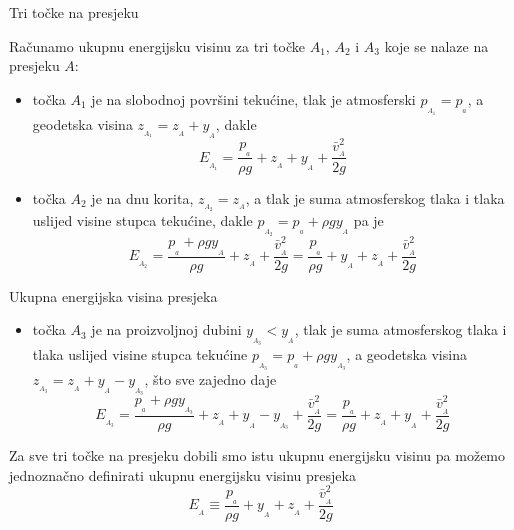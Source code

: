 \documentclass{beamer}
\begin{document}
\begin{frame}{Tri točke na presjeku}

Računamo ukupnu energijsku visinu za tri točke $A_{1}$, $A_{2}$
i $A_{3}$ koje se nalaze na presjeku $A$:
\begin{itemize}
\item točka $A_{1}$ je na slobodnoj površini tekućine, tlak je atmosferski
$p_{_{A_{1}}}=p_{_{a}}$, a geodetska visina $z_{_{A_{1}}}=z_{_{A}}+y_{_{A}}$,
dakle
\[
E_{_{A_{1}}}=\frac{p_{_{a}}}{\rho g}+z_{_{A}}+y_{_{A}}+\frac{\bar{v}_{_{A}}^{2}}{2g}
\]
\item točka $A_{2}$ je na dnu korita, $z_{_{A_{2}}}=z_{_{A}}$, a tlak
je suma atmosferskog tlaka i tlaka uslijed visine stupca tekućine,
dakle $p_{_{A_{2}}}=p_{_{a}}+\rho gy_{_{A}}$ pa je 
\[
E_{_{A_{2}}}=\frac{p_{_{a}}+\rho gy_{_{A}}}{\rho g}+z_{_{A}}+\frac{\bar{v}_{_{A}}^{2}}{2g}=\frac{p_{_{a}}}{\rho g}+y_{_{A}}+z_{_{A}}+\frac{\bar{v}_{_{A}}^{2}}{2g}
\]
\end{itemize}
\end{frame}

\begin{frame}{Ukupna energijska visina presjeka}

\begin{itemize}
\item točka $A_{3}$ je na proizvoljnoj dubini $y_{_{A_{3}}}<y_{_{A}}$,
tlak je suma atmosferskog tlaka i tlaka uslijed visine stupca tekućine
$p_{_{A_{3}}}=p_{_{a}}+\rho gy_{_{A_{3}}}$, a geodetska visina $z_{_{A_{3}}}=z_{_{A}}+y_{_{A}}-y_{_{A_{3}}}$,
što sve zajedno daje
\[
E_{_{A_{3}}}=\frac{p_{_{a}}+\rho gy_{_{A_{3}}}}{\rho g}+z_{_{A}}+y_{_{A}}-y_{_{A_{3}}}+\frac{\bar{v}_{_{A}}^{2}}{2g}=\frac{p_{_{a}}}{\rho g}+z_{_{A}}+y_{_{A}}+\frac{\bar{v}_{_{A}}^{2}}{2g}
\]
\end{itemize}
\begin{block}{}
Za sve tri točke na presjeku dobili smo istu ukupnu energijsku visinu
pa možemo jednoznačno definirati \alert{ukupnu energijsku visinu presjeka}\emph{
\[
E_{_{A}}\equiv\frac{p_{_{a}}}{\rho g}+y_{_{A}}+z_{_{A}}+\frac{\bar{v}_{_{A}}^{2}}{2g}
\]
}
\end{block}
\end{frame}
\end{document}
